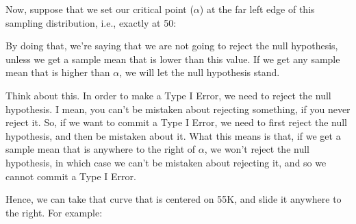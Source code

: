\documentclass[../../../main.tex]{subfiles}
\begin{document}
\noindent
Now, suppose that we set our critical point ($\alpha$) at the far left edge of this sampling distribution, i.e., exactly at 50:

\begin{center}
\end{center}

\noindent
By doing that, we're saying that we are not going to reject the null hypothesis, unless we get a sample mean that is lower than this value. If we get any sample mean that is higher than $\alpha$, we will let the null hypothesis stand.

Think about this. In order to make a Type I Error, we need to reject the null hypothesis. I mean, you can't be mistaken about rejecting something, if you never reject it. So, if we want to commit a Type I Error, we need to first reject the null hypothesis, and then be mistaken about it. What this means is that, if we get a sample mean that is anywhere to the right of $\alpha$, we won't reject the null hypothesis, in which case we can't be mistaken about rejecting it, and so we cannot commit a Type I Error.

Hence, we can take that curve that is centered on 55K, and slide it anywhere to the right. For example:
\end{document}
